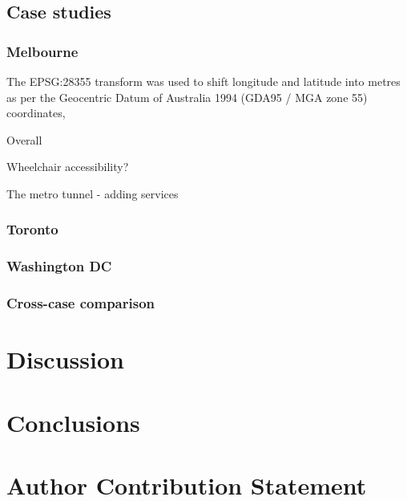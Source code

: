\documentclass[numbered]{trbunofficial}
\begin{document}
\hypertarget{case-studies}{%
\subsection{Case studies}\label{case-studies}}

\hypertarget{melbourne}{%
\subsubsection{Melbourne}\label{melbourne}}

The EPSG:28355 transform \citep{EPSG_28355} was used to shift longitude
and latitude into metres as per the Geocentric Datum of Australia 1994
(GDA95 / MGA zone 55) coordinates,

Overall

Wheelchair accessibility?

The metro tunnel - adding services

\hypertarget{toronto}{%
\subsubsection{Toronto}\label{toronto}}

\hypertarget{washington-dc}{%
\subsubsection{Washington DC}\label{washington-dc}}

\hypertarget{cross-case-comparison}{%
\subsubsection{Cross-case comparison}\label{cross-case-comparison}}

\hypertarget{discussion}{%
\section{Discussion}\label{discussion}}

\hypertarget{conclusions}{%
\section{Conclusions}\label{conclusions}}

\hypertarget{author-contribution-statement}{%
\section{Author Contribution
Statement}\label{author-contribution-statement}}
\end{document}
